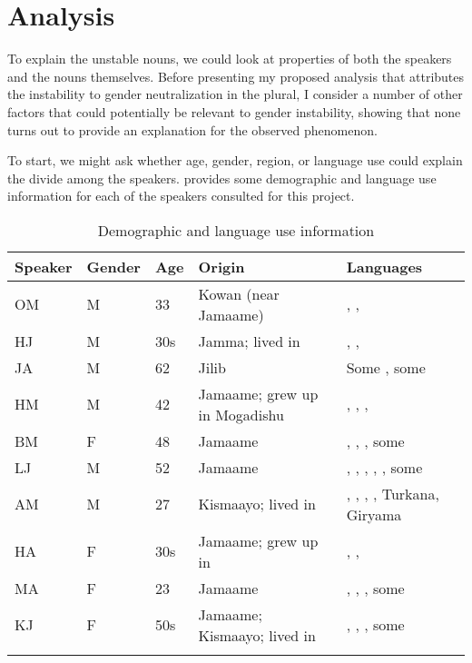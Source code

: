\documentclass[output=paper,modfonts]{langscibook}
\begin{document}
\section{Analysis}\label{sec:paster:5}

To explain the unstable nouns, we could look at properties of both the speakers and the nouns themselves. Before presenting my proposed analysis that attributes the instability to gender neutralization in the plural, I consider a number of other factors that could potentially be relevant to gender instability, showing that none turns out to provide an explanation for the observed phenomenon.

To start, we might ask whether age, gender, region, or language use could explain the divide among the speakers.  provides some demographic and language use information for each of the  speakers consulted for this project.


\begin{table}
\caption{Demographic and language use information}
\label{tab:paster:11}
 \begin{tabularx}{\textwidth}{lllQQ}
\lsptoprule
         Speaker  & Gender  & Age  & Origin &   Languages\\
\midrule
OM  &  M  &  33   & Kowan (near Jamaame)  &   , , \\
HJ  &  M  &  30s  & Jamma; lived in  &  , , \\
JA  &  M  &  62   & Jilib                 &  Some , some \\
HM  &  M  &  42   & Jamaame; grew up in Mogadishu &  , , , \\
BM  &  F  &  48   & Jamaame               &  , , , some \\
LJ  &  M  &  52   & Jamaame               &  , , , ,  , some \\
AM  &  M  &  27   & Kismaayo; lived in   &  , , , , Turkana, Giryama\\
HA  &  F  &  30s  & Jamaame; grew up in  &  , , \\
MA  &  F  &  23   & Jamaame               &  , , , some \\
KJ  &  F  &  50s  & Jamaame; Kismaayo; lived in  &   , , , some           \\
\lspbottomrule
\end{tabularx}
\end{table}
\end{document}
